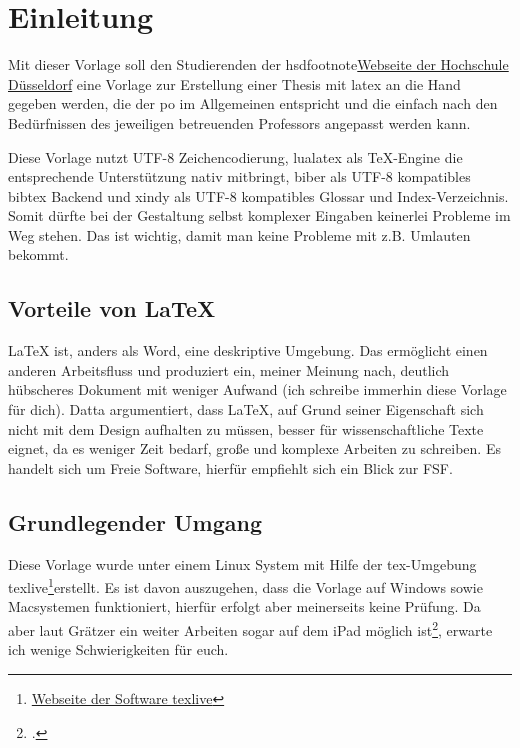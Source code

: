 \newpage

\section{Einleitung}
Mit dieser Vorlage soll den Studierenden der \gls{hsd}footnote{\href{https://www.hs-duesseldorf.de}{Webseite der Hochschule Düsseldorf}} eine Vorlage zur Erstellung einer Thesis mit \gls{latex} an die Hand gegeben werden, die der \gls{po} im Allgemeinen entspricht und die einfach nach den Bedürfnissen des jeweiligen betreuenden Professors angepasst werden kann.

Diese Vorlage nutzt UTF-8 Zeichencodierung, lualatex als TeX-Engine die entsprechende Unterstützung nativ mitbringt, biber als UTF-8 kompatibles bibtex Backend und xindy als UTF-8 kompatibles Glossar und Index-Verzeichnis. Somit dürfte bei der Gestaltung selbst komplexer Eingaben keinerlei Probleme im Weg stehen. Das ist wichtig, damit man keine Probleme mit z.B. Umlauten bekommt.

\subsection{Vorteile von LaTeX}
LaTeX ist, anders als Word, eine deskriptive Umgebung. Das ermöglicht einen anderen Arbeitsfluss und produziert ein, meiner Meinung nach, deutlich hübscheres Dokument mit weniger Aufwand (ich schreibe immerhin diese Vorlage für dich). Datta argumentiert, dass \LaTeX{}, auf Grund seiner Eigenschaft sich nicht mit dem Design aufhalten zu müssen, besser für wissenschaftliche Texte eignet, da es weniger Zeit bedarf, große und komplexe Arbeiten zu schreiben.
Es handelt sich um Freie Software, hierfür empfiehlt sich ein Blick zur \gls{FSF}.

\subsection{Grundlegender Umgang}
Diese Vorlage wurde unter einem Linux System mit Hilfe der tex-Umgebung texlive\footnote{\href{https://tug.org/texlive/}{Webseite der Software texlive}}erstellt. Es ist davon auszugehen, dass die Vorlage auf Windows sowie Macsystemen funktioniert, hierfür erfolgt aber meinerseits keine Prüfung. Da aber laut Grätzer ein weiter Arbeiten sogar auf dem iPad möglich ist\footcite[Vgl. ][S. 179ff.]{gratzerPracticalLatex2014}, erwarte ich wenige Schwierigkeiten für euch.

